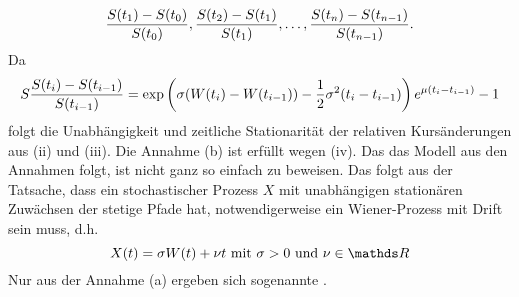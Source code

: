 \begin{itemize}
	\[
	\frac{S(t_1)-S(t_0)}{S(t_0)},\frac{S(t_2)-S(t_1)}{S(t_1)}, \dots ,\frac{S(t_n)-S(t_{n-1})}{S(t_{n-1})}.
	\]
	Da
	\[
	S\frac{S(t_i)-S(t_{i-1})}{S(t_{i-1})}= \exp\left( \sigma(W(t_i)-W(t_{i-1}))-\frac{1}{2}\sigma^2(t_i-t_{i-1})\right)e^{\mu(t_i-t_{i-1})}-1
	\]
	folgt die Unabhängigkeit und zeitliche Stationarität der relativen Kursänderungen aus (ii) und (iii).
	Die Annahme (b) ist erfüllt wegen (iv).
	Das das Modell aus den Annahmen folgt, ist nicht ganz so einfach zu beweisen.
	Das folgt aus der Tatsache, dass ein stochastischer Prozess $X$ mit unabhängigen stationären Zuwächsen der stetige Pfade hat, notwendigerweise ein Wiener-Prozess mit Drift sein muss, d.h.
	\[
	X(t)=\sigma W(t)+\nu t\text{ mit }\sigma>0\text{ und }\nu\in\R
	\]
	Nur aus der Annahme (a) ergeben sich sogenannte .
\end{itemize}

